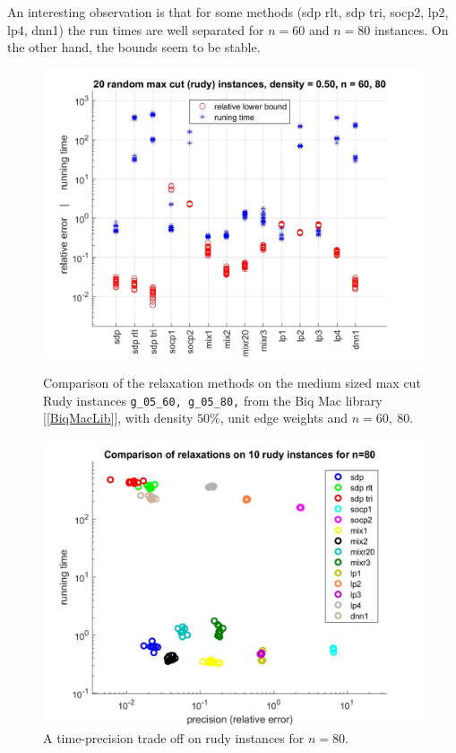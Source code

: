 \documentclass[12pt]{book}
\theoremstyle{definition}
\begin{document}
An interesting observation is that for some methods (sdp rlt, sdp tri, socp2, lp2, lp4, dnn1) the run times are well separated for $n=60$ and $n=80$ instances. On the other hand, the bounds seem to be stable.
\begin{center}
\begin{figure}
\includegraphics[scale=0.27]{img/comp1.jpg}
\caption[Comparison of relaxations - medium, dense instances of max cut]{Comparison of the relaxation methods on the medium sized max cut Rudy instances {\tt g\_05\_60, g\_05\_80,} from the Biq Mac library [\ref{BiqMacLib}], with density  $50\%$, unit edge weights and $n=60,\ 80$.} 
\label{comp1}
\includegraphics[scale=0.27]{img/comp1_segments.jpg}
\caption[Comparison of relaxations - a time-precision trade off]{A time-precision trade off on rudy instances for $n=80$.}
\label{comp1TradeOff}
\end{figure}
\end{center}
\end{document}
